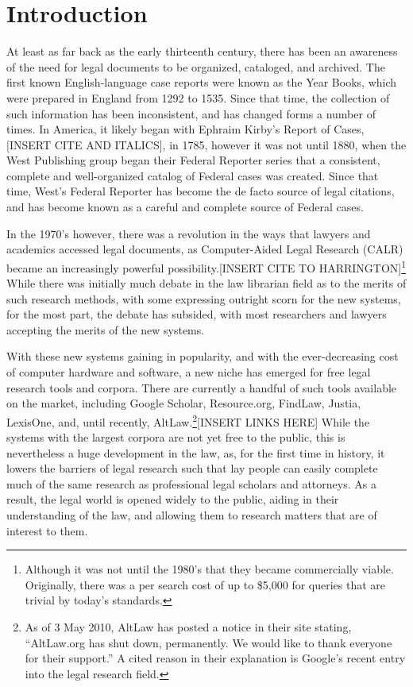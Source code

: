 \label{intro}
\section{Introduction}
At least as far back as the early thirteenth century, there has been an awareness of the need for legal documents to be organized, cataloged, and archived. The first known English-language case reports were known as the Year Books, which were prepared in England from 1292 to 1535.\cite{berring-page-17} Since that time, the collection of such information has been inconsistent, and has changed forms a number of times. 
In America, it likely began with Ephraim Kirby's Report of Cases,[INSERT CITE AND ITALICS], in 1785, however it was not until 1880, when the West Publishing group began their Federal Reporter series that a consistent, complete and well-organized catalog of Federal cases was created. Since that time, West's Federal Reporter has become the de facto source of legal citations, and has become known as a careful and complete source of Federal cases. 

In the 1970's however, there was a revolution in the ways that lawyers and academics accessed legal documents, as Computer-Aided Legal Research (CALR) became an increasingly powerful possibility.[INSERT CITE TO HARRINGTON]\footnote{Although it was not until the 1980's that they became commercially viable. Originally, there was a per search cost of up to \$5,000 for queries that are trivial by today's standards.} While there was initially much debate in the law librarian field as to the merits of such research methods, with some expressing outright scorn for the new systems, for the most part, the debate has subsided, with most researchers and lawyers accepting the merits of the new systems.

With these new systems gaining in popularity, and with the ever-decreasing cost of computer hardware and software, a new niche has emerged for free legal research tools and corpora. There are currently a handful of such tools available on the market, including Google Scholar, Resource.org, FindLaw, Justia, LexisOne, and, until recently, AltLaw.\footnote{As of 3 May 2010, AltLaw has posted a notice in their site stating, ``AltLaw.org has shut down, permanently. We would like to thank everyone for their support.'' A cited reason in their explanation is Google's recent entry into the legal research field.}[INSERT LINKS HERE]
While the systems with the largest corpora are not yet free to the public, this is nevertheless a huge development in the law, as, for the first time in history, it lowers the barriers of legal research such that lay people can easily complete much of the same research as professional legal scholars and attorneys. As a result, the legal world is opened widely to the public, aiding in their understanding of the law, and allowing them to research matters that are of interest to them.

